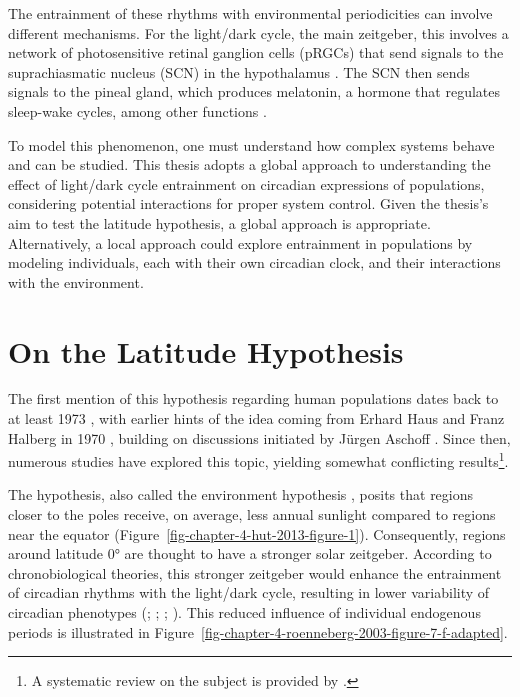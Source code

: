 \documentclass[
12pt,
openright,
oneside,
a4paper,
chapter=TITLE,
section=TITLE,
french,
spanish,
brazil,
english
]{abntex2}
\begin{document}
The entrainment of these rhythms with environmental periodicities can
involve different mechanisms. For the light/dark cycle, the main
zeitgeber, this involves a network of photosensitive retinal ganglion
cells (pRGCs) that send signals to the suprachiasmatic nucleus (SCN) in
the hypothalamus \autocite{brainard2001,thapan2001}. The SCN then sends
signals to the pineal gland, which produces melatonin, a hormone that
regulates sleep-wake cycles, among other functions
\autocite{foster2021a}.

To model this phenomenon, one must understand how complex systems behave
and can be studied. This thesis adopts a global approach to
understanding the effect of light/dark cycle entrainment on circadian
expressions of populations, considering potential interactions for
proper system control. Given the thesis's aim to test the latitude
hypothesis, a global approach is appropriate. Alternatively, a local
approach could explore entrainment in populations by modeling
individuals, each with their own circadian clock, and their interactions
with the environment.


\chapter{On the Latitude
Hypothesis}\label{sec-on-the-latitude-hypothesis}

The first mention of this hypothesis regarding human populations dates
back to at least 1973 \autocite{bohlen1973}, with earlier hints of the
idea coming from Erhard Haus and Franz Halberg in 1970
\autocite[101]{haus1970}, building on discussions initiated by Jürgen
Aschoff \autocite{aschoff1969}. Since then, numerous studies have
explored this topic, yielding somewhat conflicting results\footnote{A
  systematic review on the subject is provided by
  \textcite{randler2017}.}.

The hypothesis, also called the environment hypothesis
\autocite{horzum2015}, posits that regions closer to the poles receive,
on average, less annual sunlight compared to regions near the equator
(Figure~\ref{fig-chapter-4-hut-2013-figure-1}). Consequently, regions
around latitude \(0°\) are thought to have a stronger solar zeitgeber.
According to chronobiological theories, this stronger zeitgeber would
enhance the entrainment of circadian rhythms with the light/dark cycle,
resulting in lower variability of circadian phenotypes
(\textcite{aschoff1960}; \textcite{pittendrigh1960}
\textcite{aschoff1981}; \textcite{pittendrigh1989};
\textcite{pittendrigh1991}). This reduced influence of individual
endogenous periods is illustrated in
Figure~\ref{fig-chapter-4-roenneberg-2003-figure-7-f-adapted}.
\end{document}
